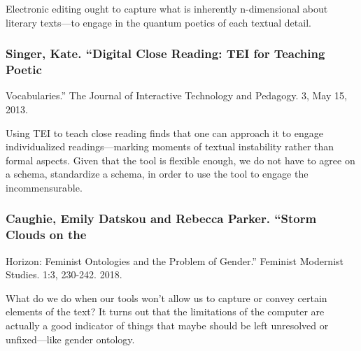 \documentclass[11pt]{article}
\begin{document}
Electronic editing ought to capture what is inherently n-dimensional
about literary texts---to engage in the quantum poetics of each
textual detail.

\subsubsection{Singer, Kate. “Digital Close Reading: TEI for Teaching Poetic}
\label{sec:org7938b78}
Vocabularies.” The Journal of Interactive Technology and Pedagogy. 3,
May 15, 2013.

Using TEI to teach close reading finds that one can approach it to
engage individualized readings---marking moments of textual
instability rather than formal aspects. Given that the tool is
flexible enough, we do not have to agree on a schema, standardize a
schema, in order to use the tool to engage the incommensurable.


\subsubsection{Caughie, Emily Datskou and Rebecca Parker. “Storm Clouds on the}
\label{sec:org30ad327}
Horizon: Feminist Ontologies and the Problem of Gender.” Feminist
Modernist Studies. 1:3, 230-242. 2018.

What do we do when our tools won’t allow us to capture or convey
certain elements of the text? It turns out that the limitations of the
computer are actually a good indicator of things that maybe should be
left unresolved or unfixed---like gender ontology.
\end{document}
